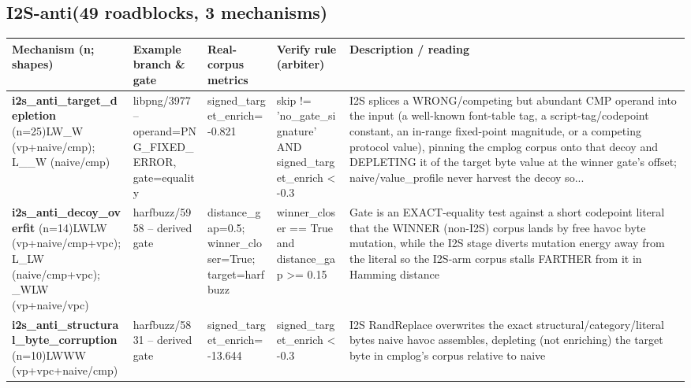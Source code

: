 \documentclass[7pt]{extarticle}
\begin{document}
\subsection*{I2S-anti\quad(49 roadblocks, 3 mechanisms)}
{\scriptsize\begin{longtable}{@{}p{3.3cm}p{3.6cm}p{4.4cm}p{4.2cm}p{6.6cm}@{}}
\toprule \textbf{Mechanism (n; shapes)}&\textbf{Example branch \& gate}&\textbf{Real-corpus metrics}&\textbf{Verify rule (arbiter)}&\textbf{Description / reading}\\\midrule\endhead
\textbf{i2s\_\allowbreak anti\_\allowbreak target\_\allowbreak depletion} (n=25)\newline LW\_\allowbreak W (vp+naive/cmp); L\_\allowbreak \_\allowbreak W (naive/cmp) & libpng/3977 -- operand=PNG\_\allowbreak FIXED\_\allowbreak ERROR, gate=equality & signed\_\allowbreak target\_\allowbreak enrich=-0.821 & skip != 'no\_\allowbreak gate\_\allowbreak signature' AND signed\_\allowbreak target\_\allowbreak enrich \textless{} -0.3 & I2S splices a WRONG/competing but abundant CMP operand into the input (a well-known font-table tag, a script-tag/codepoint constant, an in-range fixed-point magnitude, or a competing protocol value), pinning the cmplog corpus onto that decoy and DEPLETING it of the target byte value at the winner gate's offset; naive/value\_\allowbreak profile never harvest the decoy so...\\\midrule
\textbf{i2s\_\allowbreak anti\_\allowbreak decoy\_\allowbreak overfit} (n=14)\newline LWLW (vp+naive/cmp+vpc); L\_\allowbreak LW (naive/cmp+vpc); \_\allowbreak WLW (vp+naive/vpc) & harfbuzz/5958 -- derived gate & distance\_\allowbreak gap=0.5; winner\_\allowbreak closer=True; target=harfbuzz & winner\_\allowbreak closer == True and distance\_\allowbreak gap \textgreater{}= 0.15 & Gate is an EXACT-equality test against a short codepoint literal that the WINNER (non-I2S) corpus lands by free havoc byte mutation, while the I2S stage diverts mutation energy away from the literal so the I2S-arm corpus stalls FARTHER from it in Hamming distance\\\midrule
\textbf{i2s\_\allowbreak anti\_\allowbreak structural\_\allowbreak byte\_\allowbreak corruption} (n=10)\newline LWWW (vp+vpc+naive/cmp) & harfbuzz/5831 -- derived gate & signed\_\allowbreak target\_\allowbreak enrich=-13.644 & signed\_\allowbreak target\_\allowbreak enrich \textless{} -0.3 & I2S RandReplace overwrites the exact structural/category/literal bytes naive havoc assembles, depleting (not enriching) the target byte in cmplog's corpus relative to naive\\\midrule
\bottomrule\end{longtable}}\par\medskip
\end{document}
